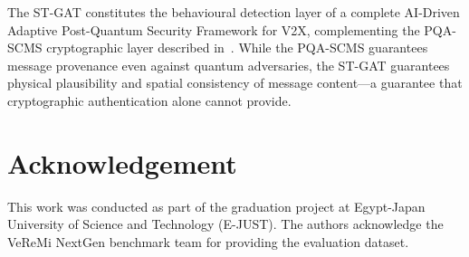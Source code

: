 \documentclass[conference]{IEEEtran}
\begin{document}
The ST-GAT constitutes the behavioural detection layer of a complete
AI-Driven Adaptive Post-Quantum Security Framework for V2X, complementing
the PQA-SCMS cryptographic layer described in~\cite{pqascms2025}.  While
the PQA-SCMS guarantees message provenance even against quantum adversaries,
the ST-GAT guarantees physical plausibility and spatial consistency of
message content---a guarantee that cryptographic authentication alone
cannot provide.

\section*{Acknowledgement}
This work was conducted as part of the graduation project at
Egypt-Japan University of Science and Technology (E-JUST).
The authors acknowledge the VeReMi NextGen benchmark team
for providing the evaluation dataset.
\end{document}
